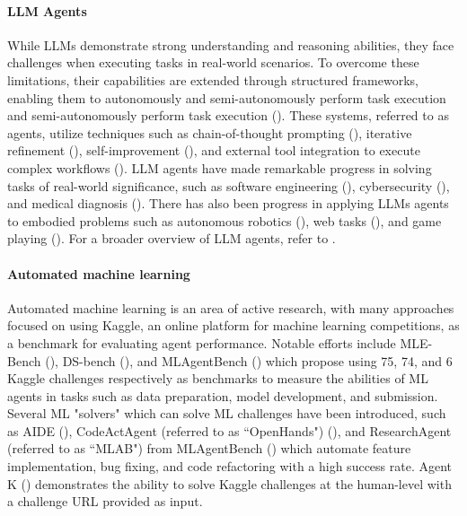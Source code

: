 \documentclass[11pt, a4paper]{gdm_format}
\begin{document}
\paragraph{LLM Agents}
While LLMs demonstrate strong understanding and reasoning abilities, they face challenges when executing tasks in real-world scenarios.
To overcome these limitations, their capabilities are extended through structured frameworks, enabling them to autonomously and semi-autonomously perform task execution and semi-autonomously perform task execution (\cite{wu2023autogen, li2023camel, chen2023agentverse, qian2024chatdev}).
These systems, referred to as agents, utilize techniques such as chain-of-thought prompting (\cite{wei2022chain}), iterative refinement (\cite{shinn2024reflexion}), self-improvement (\cite{huang2022large}), and external tool integration to execute complex workflows (\cite{hao2024toolkengpt, qin2023toolllm, schick2023toolformer}). 
LLM agents have made remarkable progress in solving tasks of real-world significance, such as software engineering (\cite{jimenez2023swe, yang2024swe, wang2024opendevin}), cybersecurity (\cite{abramovich2024enigma, wan2024cyberseceval, fang2024llm}), and medical diagnosis (\cite{tu2024towards, schmidgall2024agentclinic, mcduff2023towards}). There has also been progress in applying LLMs agents to embodied problems such as autonomous robotics (\cite{brohan2022rt, kimsurgical, black2024pi_0, brohan2023rt}), web tasks (\cite{gur2023real, putta2024agent, deng2024mind2web, shi2017world, he2024webvoyager}), and game playing (\cite{wang2023voyager, feng2024chessgpt, al2024project}).  For a broader overview of LLM agents, refer to \cite{wang2024survey}.  



\paragraph{Automated machine learning}

Automated machine learning is an area of active research, with many approaches focused on using Kaggle, an online platform for machine learning competitions, as a benchmark for evaluating agent performance. Notable efforts include MLE-Bench (\cite{chan2024mle}), DS-bench (\cite{jing2024dsbench}), and MLAgentBench (\cite{huang2024mlagentbench}) which propose using 75, 74, and 6 Kaggle challenges respectively as benchmarks to measure the abilities of ML agents in tasks such as data preparation, model development, and submission.  Several ML "solvers" which can solve ML challenges have been introduced, such as AIDE (\cite{AIDE}), CodeActAgent (referred to as “OpenHands") (\cite{wang2024opendevin}), and ResearchAgent (referred to as “MLAB") from MLAgentBench (\cite{huang2024mlagentbench}) which automate feature implementation, bug fixing, and code refactoring with a high success rate.
Agent K (\cite{grosnit2024large}) demonstrates the ability to solve Kaggle challenges at the human-level with a challenge URL provided as input. 
\end{document}
